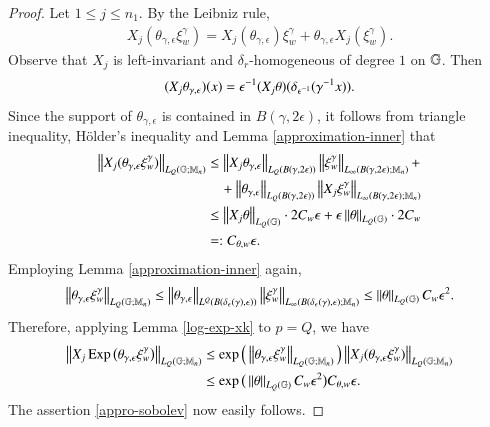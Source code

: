 \documentclass[leqno]{amsart}
\begin{document}
\begin{proof}
		
		Let $1\leq j\leq n_1$. By the Leibniz rule, 
		\begin{align*}
			X_{j}(\theta_{\gamma,\epsilon}\xi^{\gamma}_{w})=
			X_{j}(\theta_{\gamma,\epsilon})\xi^{\gamma}_{w}+\theta_{\gamma,\epsilon}X_{j}(\xi^{\gamma}_{w}).
		\end{align*}
		Observe that $X_{j}$ is left-invariant and $\delta_{r}$-homogeneous of degree $1$ on $\mathbb{G}$.
		Then
		\begin{align*}
			(X_{j}\theta_{\gamma,\epsilon})(x)=\epsilon^{-1} (X_{j}\theta)(\delta_{\epsilon^{-1}}(\gamma^{-1}x)).
		\end{align*}
		Since the support of $\theta_{\gamma,\epsilon}$ is contained in $B(\gamma,2\epsilon)$,
		it follows from triangle inequality, H\"{o}lder's inequality and Lemma \ref{approximation-inner} that
		\begin{align*}
			\left\| X_{j}(\theta_{\gamma,\epsilon}\xi^{\gamma}_{w}) \right\|_{L_{Q}(\mathbb{G};\mathbb{M}_{n})}
			&\leq\left\| X_{j}\theta_{\gamma,\epsilon} \right\|_{L_{Q}(B(\gamma,2\epsilon))}
			\left\| \xi^{\gamma}_{w} \right\|_{L_{\infty}(B(\gamma,2\epsilon);\mathbb{M}_{n})}+\\
			&\quad+\left\| \theta_{\gamma,\epsilon} \right\|_{L_{Q}(B(\gamma,2\epsilon))}
			\left\| X_{j}\xi^{\gamma}_{w} \right\|_{L_{\infty}(B(\gamma,2\epsilon);\mathbb{M}_{n})}\\
			&\leq\left\| X_{j}\theta \right\|_{L_{Q}(\mathbb{G})}\cdot 2C_{w}\epsilon+\epsilon\left\| \theta \right\|_{L_{Q}(\mathbb{G})}\cdot 2C_{w}\\
			&=:C_{\theta,w}\epsilon.
		\end{align*}
		Employing Lemma \ref{approximation-inner} again,
		\begin{align*}
			\left\| \theta_{\gamma,\epsilon}\xi^{\gamma}_{w} \right\|_{L_{Q}(\mathbb{G};\mathbb{M}_{n})}
			\leq\left\| \theta_{\gamma,\epsilon} \right\|_{L^{Q}(B(\delta_{\epsilon}(\gamma),\epsilon))}
			\left\| \xi^{\gamma}_{w} \right\|_{L_{\infty}(B(\delta_{\epsilon}(\gamma),\epsilon);\mathbb{M}_{n})}
			\leq \left\| \theta \right\|_{L_{Q}(\mathbb{G})}C_{w}\epsilon^{2}.
		\end{align*}
		Therefore, applying Lemma \ref{log-exp-xk} to $p=Q$, we have
		\begin{align*}
			\left\| X_{j}\operatorname{\rm Exp}\big(\theta_{\gamma,\epsilon}\xi^{\gamma}_{w}\big) \right\|_{L_{Q}(\mathbb{G};\mathbb{M}_{n})}
			&\leq \exp\Big(\left\| \theta_{\gamma,\epsilon}\xi^{\gamma}_{w} \right\|_{L_{Q}(\mathbb{G};\mathbb{M}_{n})}\Big) \left\| X_{j}(\theta_{\gamma,\epsilon}\xi^{\gamma}_{w}) \right\|_{L_{Q}(\mathbb{G};\mathbb{M}_{n})}\\
			&\leq \exp\big(\left\| \theta \right\|_{L_{Q}(\mathbb{G})}C_{w}\epsilon^{2}\big)C_{\theta,w}\epsilon.
		\end{align*}
		The assertion \eqref{appro-sobolev} now easily follows.
		

\end{proof}
\end{document}
